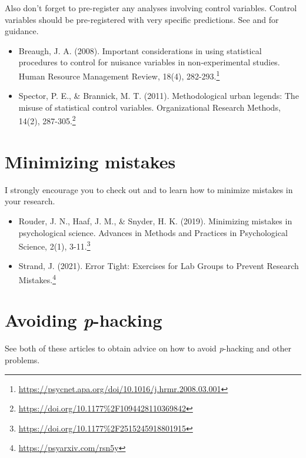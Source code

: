 \documentclass[
]{krantz}
\renewcommand{\href}[2]{#2\footnote{\url{#1}}}
\begin{document}
Also don't forget to pre-register any analyses involving control variables. Control variables should be pre-registered with very specific predictions. See \citep{breaugh2008important} and \citep{spector2011methodological} for guidance.

\begin{itemize}
\item
  \href{https://psycnet.apa.org/doi/10.1016/j.hrmr.2008.03.001}{Breaugh, J. A. (2008). Important considerations in using statistical procedures to control for nuisance variables in non-experimental studies. Human Resource Management Review, 18(4), 282-293.}
\item
  \href{https://doi.org/10.1177\%2F1094428110369842}{Spector, P. E., \& Brannick, M. T. (2011). Methodological urban legends: The misuse of statistical control variables. Organizational Research Methods, 14(2), 287-305.}
\end{itemize}

\hypertarget{minimizing-mistakes}{%
\section{Minimizing mistakes}\label{minimizing-mistakes}}

I strongly encourage you to check out \citep{rouder2019minimizing} and \citep{strand2021error} to learn how to minimize mistakes in your research.

\begin{itemize}
\item
  \href{https://doi.org/10.1177\%2F2515245918801915}{Rouder, J. N., Haaf, J. M., \& Snyder, H. K. (2019). Minimizing mistakes in psychological science. Advances in Methods and Practices in Psychological Science, 2(1), 3-11.}
\item
  \href{https://psyarxiv.com/rsn5y}{Strand, J. (2021). Error Tight: Exercises for Lab Groups to Prevent Research Mistakes.}
\end{itemize}

\hypertarget{avoiding-p-hacking}{%
\section{\texorpdfstring{Avoiding \emph{p}-hacking}{Avoiding p-hacking}}\label{avoiding-p-hacking}}

See both of these articles \citep{wicherts2016degrees, stratton2005ensure} to obtain advice on how to avoid \emph{p}-hacking and other problems.
\end{document}

